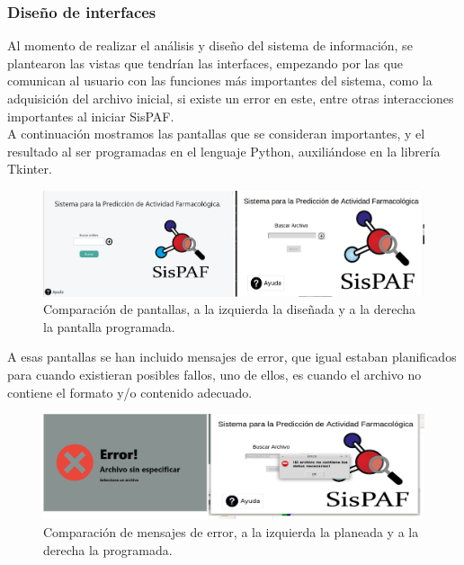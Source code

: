 \subsubsection{Diseño de interfaces}{
\noindent Al momento de  realizar el análisis y diseño del sistema de información,  se plantearon las vistas que tendrían las interfaces, empezando por las que comunican al usuario con las funciones más importantes del sistema, como la adquisición del archivo inicial, si existe un  error en este, entre otras interacciones importantes al iniciar SisPAF.\\

\noindent A continuación mostramos las pantallas que se consideran importantes, y el resultado al ser programadas en el lenguaje Python, auxiliándose en la librería Tkinter.

\begin{figure}[H]
    \centering
    \includegraphics[scale=0.215]{Capitulo4/Documentos/imagenes_generacion/ComparacionPan1.png}
    \caption{Comparación de pantallas, a la izquierda la diseñada y  a la derecha la pantalla programada.}
    \label{comparacion}
\end{figure}

\noindent A esas pantallas se han incluido mensajes de error, que igual estaban planificados para cuando existieran posibles fallos, uno de ellos, es cuando el archivo no contiene el formato y/o contenido adecuado.\\

\begin{figure}[H]
    \centering
    \includegraphics[scale=0.375]{Capitulo4/Documentos/imagenes_generacion/PickwrongAr.png}
    \caption{Comparación de mensajes de error, a la izquierda la planeada y a la derecha la programada.}
    \label{comparacion_2}
\end{figure}

}
